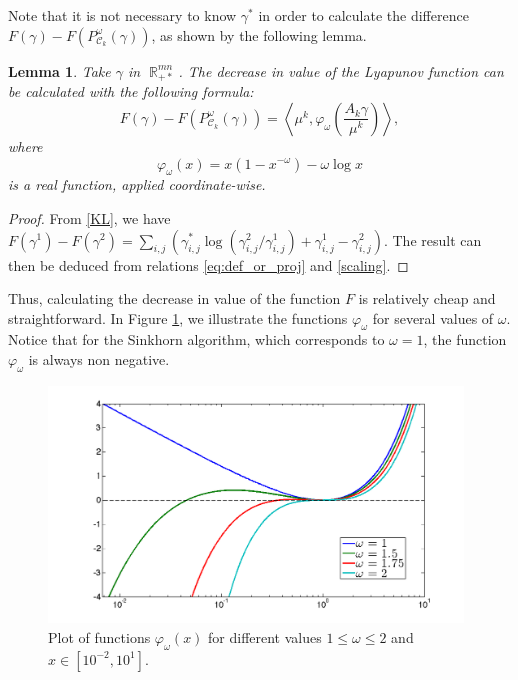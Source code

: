 \documentclass{article} %
\newcommand{\scal}[2]{\left\langle #1 , #2 \right\rangle}
\DeclareMathOperator{\IR}{\mathbb{R}}
\DeclareMathOperator{\Ccal}{\mathcal{C}}
\theoremstyle{plain}
\newtheorem{lemma}{Lemma}
\theoremstyle{definition}
\theoremstyle{remark}
\begin{document}
Note that it is not necessary to know $\gamma^*$ in order to calculate the difference $F(\gamma) - F(P^\omega_{\Ccal_k}(\gamma))$, as shown by the following lemma.
\begin{lemma}\label{lemma:lyapunov_decrease}
	Take $\gamma$ in $\IR^{mn}_{+*}$. The decrease in value of the Lyapunov function can be calculated with the following formula:
	\begin{equation} \label{eq:kl_diff_scal}
	F(\gamma) - F(P^\omega_{\Ccal_k}(\gamma)) = 
	\scal{\mu^k}{\varphi_\omega \left(\frac{A_k \gamma}{\mu^k}\right)},
	\end{equation}
	where
	\begin{equation}
	\varphi_\omega(x) = x(1-x^{-\omega}) - \omega \log x
	\end{equation}
	is a real function, applied coordinate-wise.
\end{lemma}
\begin{proof}
From \eqref{KL}, we have $F(\gamma^1)-F(\gamma^2)= \sum_{i,j}\left(\gamma^*_{i,j}\log(\gamma^2_{i,j}/\gamma^1_{i,j})+\gamma^1_{i,j}-\gamma^2_{i,j}\right)$. The result can then be deduced from relations \eqref{eq:def_or_proj} and \eqref{scaling}.
\end{proof}
Thus, calculating the decrease in value of the function $F$ is relatively cheap and straightforward. In Figure \ref{phi_omega}, we illustrate the functions  $\varphi_\omega$ for several values of $\omega$. Notice that for the Sinkhorn algorithm, which corresponds to $\omega=1$, the function $\varphi_\omega$ is always non negative.
\begin{figure}[ht!]
\begin{center}
\includegraphics[width=11cm]{phi_omega.png}
\caption{\label{phi_omega} Plot of functions $\varphi_\omega(x)$ for different values $1\leq \omega\leq 2$ and   $x\in[10^{-2}, 10^1]$.}
\end{center}
\end{figure}
\end{document}
